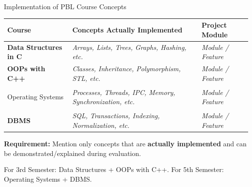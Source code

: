 \documentclass[aspectratio=169,11pt]{beamer}
\newcommand{\smallnote}[1]{%
\vspace{0.08cm}
{\scriptsize\color{GEUGrey}#1}
}
\newcommand{\placeholder}[1]{%
\textit{\color{GEUGrey}#1}
}
\begin{document}
\begin{frame}{Implementation of PBL Course Concepts}

\scriptsize

\begin{center}

\renewcommand{\arraystretch}{1.25}

\begin{tabularx}{.96\textwidth}
{@{}>{\bfseries}p{2.8cm}X p{2.8cm}@{}}

\toprule
Course & Concepts Actually Implemented & Project Module\\
\midrule

Data Structures in C &
\placeholder{Arrays, Lists, Trees, Graphs, Hashing, etc.} &
\placeholder{Module / Feature}\\

OOPs with C++ &
\placeholder{Classes, Inheritance, Polymorphism, STL, etc.} &
\placeholder{Module / Feature}\\

\midrule

Operating Systems &
\placeholder{Processes, Threads, IPC, Memory, Synchronization, etc.} &
\placeholder{Module / Feature}\\

DBMS &
\placeholder{SQL, Transactions, Indexing, Normalization, etc.} &
\placeholder{Module / Feature}\\

\bottomrule

\end{tabularx}

\end{center}

\vfill

\begin{center}
\colorbox{GEULightBlue}{
\parbox{.88\textwidth}{
\centering
\textbf{Requirement:}
Mention only concepts that are \textbf{actually implemented}
and can be demonstrated/explained during evaluation.
}}
\end{center}

\smallnote{
For 3rd Semester: Data Structures + OOPs with C++.
For 5th Semester: Operating Systems + DBMS.
}

\end{frame}
\end{document}
